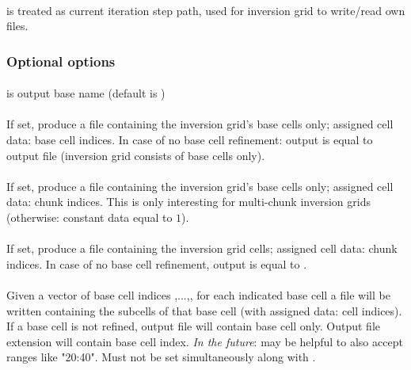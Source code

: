 \paragraph{}
 is treated as current iteration step path, used for inversion grid to write/read own files.
\subsubsection{Optional options}
\paragraph{}
 is output base name (default is )
\paragraph{}
If set, produce a  file containing the inversion grid's base cells only; assigned cell data:
base cell indices. In case of no base cell refinement: output is equal to  output file
(inversion grid consists of base cells only).
\paragraph{}
If set, produce a  file containing the inversion grid's base cells only; assigned cell data:
chunk indices. This is only interesting for multi-chunk inversion grids (otherwise: constant data equal to $1$).
\paragraph{}
If set, produce a  file containing the inversion grid cells; assigned cell data:
chunk indices. In case of no base cell refinement, output is equal to .
\paragraph{}
Given a vector of  base cell indices ,...,, for each indicated base cell 
a  file will be written containing the subcells of that base cell (with assigned data: cell indices).
If a base cell is not refined, output file will contain base cell only. Output file extension will contain base
cell index. \emph{In the future}: may be helpful to also accept ranges like "20:40".
Must not be set simultaneously along with .
